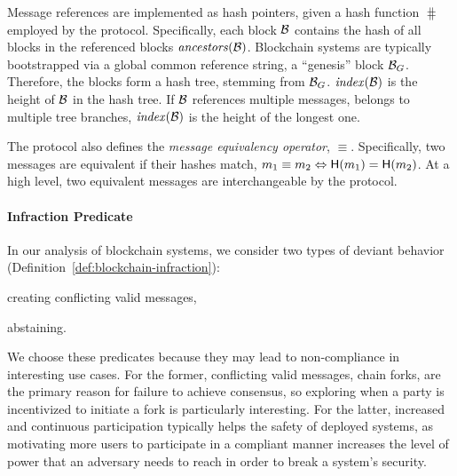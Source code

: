 \noindent Message references are implemented as hash pointers, given a hash function
$\hash$ employed by the protocol. Specifically, each block $\mathcal{B}$ contains the
hash of all blocks in the referenced blocks $\mathit{ancestors}(\mathcal{B})$.
Blockchain systems
are typically bootstrapped via a global common reference string, \ie a
``genesis'' block $\mathcal{B}_G$.
Therefore, the blocks form a hash tree, stemming from $\mathcal{B}_G$.
$\mathit{index}(\mathcal{B})$ is the height of $\mathcal{B}$ in the hash tree. If
$\mathcal{B}$ references multiple messages, \ie belongs to multiple tree branches,
$\mathit{index}(\mathcal{B})$ is the height of the longest one.

The protocol also defines the \emph{message equivalency operator}, $\equiv$. Specifically, two messages are equivalent if
their hashes match, \ie $m_1 \equiv m_2 \Leftrightarrow \mathsf{H}(m_1) =
\mathsf{H}(m_2)$. At a high level, two equivalent messages are
interchangeable by the protocol.

\paragraph{Infraction Predicate}\label{sec:blockchain-infraction-predicate}
In our analysis of blockchain systems, we consider two types of deviant
behavior (Definition~\ref{def:blockchain-infraction}):
\begin{inparaenum}[i)]
    \item creating conflicting valid messages,
    \item abstaining.
\end{inparaenum}
We choose these predicates because they may lead to non-compliance in
interesting use cases. For the former, conflicting valid messages, \ie chain
forks, are the primary reason for failure to achieve consensus, so exploring
when a party is incentivized to initiate a fork is particularly interesting.
For the latter, increased and continuous participation typically helps the
safety of deployed systems, as motivating more users to participate in a
compliant manner increases the level of power that an adversary needs to reach
in order to break a system's security.

